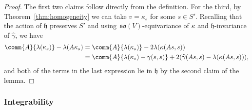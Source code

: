 \documentclass[pdftex]{sigma}
\numberwithin{equation}{section}
\newcommand{\fh}{\mathfrak{h}}
\newcommand{\fso}{\mathfrak{so}}
\newcommand{\gammahat}{\widehat{\gamma}}
\newcommand{\1}{\mathbbm{1}}
\begin{document}
\begin{proof}
	The first two claims follow directly from the definition. For the third, by Theorem~\ref{thm:homogeneity} we can take $v=\kappa_s$ for some $s\in S'$. Recalling that the action of $\fh$ preserves $S'$ and using~$\fso(V)$-equivariance of $\kappa$ and $\fh$-invariance of $\gammahat$, we have
	\begin{align*}
		\comm{A}{\lambda(\kappa_s)} - \lambda(A\kappa_s)
		 &= \comm{A}{\lambda(\kappa_s)} - 2\lambda(\kappa(As,s))\\
		 &= \comm{A}{\lambda(\kappa_s)-\gamma(s,s)} + 2(\gammahat(As,s)-\lambda(\kappa(As,s))),
	\end{align*}
	and both of the terms in the last expression lie in $\fh$ by the second claim of the lemma.
\end{proof}

\subsubsection{Integrability}
\label{sec:integrability}
\end{document}
